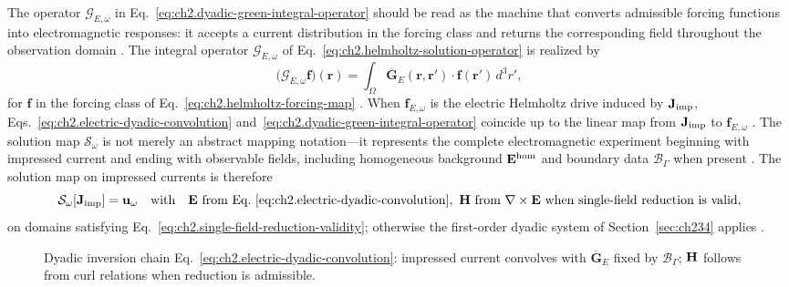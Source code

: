 The operator $\mathcal{G}_{E,\omega}$ in Eq.~\eqref{eq:ch2.dyadic-green-integral-operator}
should be read as the machine that converts admissible forcing functions into electromagnetic
responses: it accepts a current distribution in the forcing class and returns the
corresponding field throughout the observation domain \cite{harrington2001}. The integral operator \(\mathcal{G}_{E,\omega}\) of
Eq.~\eqref{eq:ch2.helmholtz-solution-operator} is realized by
\begin{equation}
\label{eq:ch2.dyadic-green-integral-operator}
\big(\mathcal{G}_{E,\omega}\mathbf{f}\big)(\mathbf{r})
=
\int_{\Omega}
\overline{\mathbf{G}}_{E}(\mathbf{r},\mathbf{r}')\cdot\mathbf{f}(\mathbf{r}')\,d^{3}r',
\end{equation}
for \(\mathbf{f}\) in the forcing class of Eq.~\eqref{eq:ch2.helmholtz-forcing-map}
\cite{stratton1941}. When \(\mathbf{f}_{E,\omega}\) is the electric Helmholtz drive
induced by \(\mathbf{J}_{\mathrm{imp}}\), Eqs.~\eqref{eq:ch2.electric-dyadic-convolution}
and~\eqref{eq:ch2.dyadic-green-integral-operator} coincide up to the linear map from
\(\mathbf{J}_{\mathrm{imp}}\) to \(\mathbf{f}_{E,\omega}\) \cite{harrington2001}. The solution map
$\mathcal{S}_\omega$ is not merely an abstract mapping notation---it represents the complete
electromagnetic experiment beginning with impressed current and ending with observable
fields, including homogeneous background $\mathbf{E}^{\mathrm{hom}}$ and boundary data
$\mathcal{B}_\Gamma$ when present \cite{stratton1941}. The solution map on
impressed currents is therefore
\begin{equation}
\label{eq:ch2.solution-map-dyadic-realization}
\mathcal{S}_\omega[\mathbf{J}_{\mathrm{imp}}]
=
\mathbf{u}_\omega
\quad\text{with}\quad
\mathbf{E}\ \text{from Eq.~\eqref{eq:ch2.electric-dyadic-convolution}},\
\mathbf{H}\ \text{from}\ \nabla\times\mathbf{E}\ \text{when single-field reduction is valid},
\end{equation}
on domains satisfying Eq.~\eqref{eq:ch2.single-field-reduction-validity}; otherwise
the first-order dyadic system of Section~\ref{sec:ch234} applies
\cite{stratton1941}.
\begin{figure}[t]
\centering
{}
\caption{Dyadic inversion chain Eq.~\eqref{eq:ch2.electric-dyadic-convolution}:
impressed current convolves with \(\overline{\mathbf{G}}_{E}\) fixed by
\(\mathcal{B}_\Gamma\); \(\mathbf{H}\) follows from curl relations when reduction is admissible.}
\label{fig:ch2.dyadic-convolution-measurement chain}
\end{figure}
